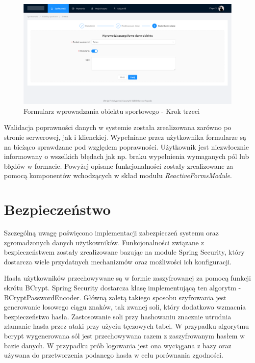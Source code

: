 \begin{figure}[H]
\centering
\includegraphics[width=\linewidth]{06-implementacja/rys/form3.PNG}
\caption{Formularz wprowadzania obiektu sportowego - Krok trzeci}
\label{fig:sample-form3}
\end{figure}

Walidacja poprawności danych w systemie została zrealizowana zarówno po stronie serwerowej, jak i klienckiej. Wypełniane przez użytkownika formularze są na bieżąco sprawdzane pod względem poprawności. Użytkownik jest niezwłocznie informowany o wszelkich błędach jak np. braku wypełnienia wymaganych pól lub błędów w formacie. Powyżej opisane funkcjonalności zostały zrealizowane za pomocą komponentów wchodzących w skład modułu \textit{ReactiveFormsModule}.


\section{Bezpieczeństwo}

Szczególną uwagę poświęcono implementacji zabezpieczeń systemu oraz zgromadzonych danych użytkowników. Funkcjonalności związane z bezpieczeństwem zostały zrealizowane bazując na module Spring Security, który dostarcza wiele przydatnych mechanizmów oraz możliwości ich konfiguracji.

Hasła użytkowników przechowywane są w formie zaszyfrowanej za pomocą funkcji skrótu BCrypt. Spring Security dostarcza klasę implementującą ten algorytm - BCryptPasswordEncoder. Główną zaletą takiego sposobu szyfrowania jest generowanie losowego ciągu znaków, tak zwanej soli, który dodatkowo wzmacnia bezpieczeństwo hasła. Zastosowanie soli przy hashowaniu znacznie utrudnia złamanie hasła przez ataki przy użyciu tęczowych tabel. W przypadku algorytmu bcrypt wygenerowana sól jest przechowywana razem z zaszyfrowanym hasłem w bazie danych. W przypadku prób logowania jest ona wyciągana z bazy oraz używana do przetworzenia podanego hasła w celu porównania zgodności.

